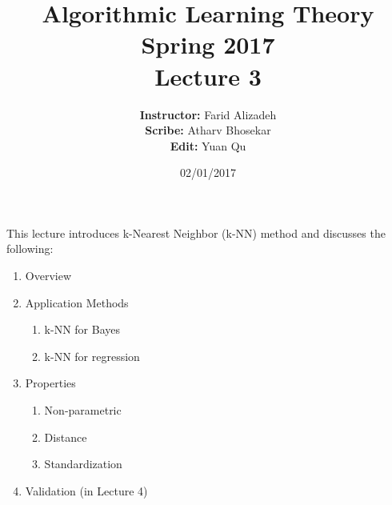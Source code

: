 \documentclass{article}
\title{ 
    Algorithmic Learning Theory\\
    Spring 2017\\
    Lecture 3
}
\author{
    {\bf Instructor:} Farid Alizadeh\\
    {\bf Scribe:} Atharv Bhosekar\\
    {\bf Edit:} Yuan Qu\\
}
\date{02/01/2017}
\begin{document}
\pagestyle{fancy}



\maketitle

\medskip

This lecture introduces k-Nearest Neighbor (k-NN) method and discusses the following:  


\begin{enumerate}
    \item Overview
    \item Application Methods
        \begin{enumerate}
            \item k-NN for Bayes
            \item k-NN for regression
        \end{enumerate}
    \item Properties
        \begin{enumerate}
            \item Non-parametric
            \item Distance
            \item Standardization
        \end{enumerate}
    \item Validation (in Lecture 4)
\end{enumerate}     

\clearpage 
\end{document}
